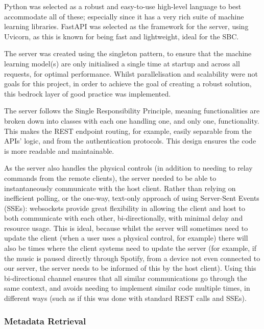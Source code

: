             Python was selected as a robust and easy-to-use high-level language to best accommodate all of these; especially since it has a very rich suite of machine learning libraries. FastAPI was selected as the framework for the server, using Uvicorn, as this is known for being fast and lightweight, ideal for the SBC.
    
            The server was created using the singleton pattern, to ensure that the machine learning model(s) are only initialised a single time at startup and across all requests, for optimal performance. Whilst parallelisation and scalability were not goals for this project, in order to achieve the goal of creating a robust solution, this bedrock layer of good practice was implemented.
    
            The server follows the Single Responsibility Principle, meaning functionalities are broken down into classes with each one handling one, and only one, functionality. This makes the REST endpoint routing, for example, easily separable from the APIs' logic, and from the authentication protocols. This design ensures the code is more readable and maintainable.
    
            As the server also handles the physical controls (in addition to needing to relay commands from the remote clients), the server needed to be able to instantaneously communicate with the host client. Rather than relying on inefficient polling, or the one-way, text-only approach of using Server-Sent Events (SSEs): websockets provide great flexibility in allowing the client and host to both communicate with each other, bi-directionally, with minimal delay and resource usage. This is ideal, because whilst the server will sometimes need to update the client (when a user uses a physical control, for example) there will also be times where the client systems need to update the server (for example, if the music is paused directly through Spotify, from a device not even connected to our server, the server needs to be informed of this by the host client). Using this bi-directional channel ensures that all similar communications go through the same context, and avoids needing to implement similar code multiple times, in different ways (such as if this was done with standard REST calls and SSEs).
        
            \subsubsection{Metadata Retrieval}
    
